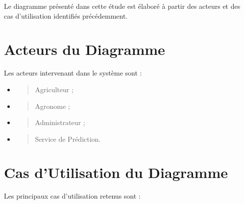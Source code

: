 Le diagramme présenté dans cette étude est élaboré à partir des acteurs
et des cas d'utilisation identifiés précédemment.

\hypertarget{acteurs-du-diagramme}{%
\section{Acteurs du Diagramme}\label{acteurs-du-diagramme}}

Les acteurs intervenant dans le système sont :

\begin{itemize}
\item
  \begin{quote}
  Agriculteur ;
  \end{quote}
\item
  \begin{quote}
  Agronome ;
  \end{quote}
\item
  \begin{quote}
  Administrateur ;
  \end{quote}
\item
  \begin{quote}
  Service de Prédiction.
  \end{quote}
\end{itemize}

\hypertarget{cas-dutilisation-du-diagramme}{%
\section{Cas d'Utilisation du
Diagramme}\label{cas-dutilisation-du-diagramme}}

Les principaux cas d'utilisation retenus sont :

